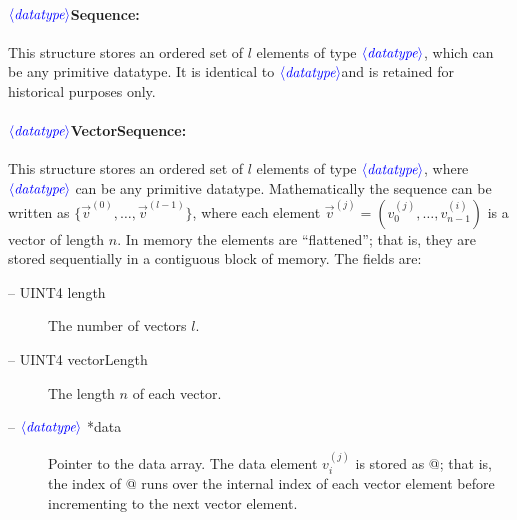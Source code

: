 \documentclass[10pt]{ligodcc}
\renewcommand{\texttt}[1]{{\ttfamily\color{blue}#1}}
\newcommand{\opt}[1]{\ensuremath{\color{blue}\langle\textit{#1}\rangle}}
\begin{document}
\paragraph{\opt{datatype}\texttt{Sequence}:}
This structure stores an ordered set of $l$ elements of type
\opt{datatype}, which can be any primitive datatype.  It is
identical to \opt{datatype}\verb@Vector@ and is retained for historical
purposes only.

\paragraph{\opt{datatype}\texttt{VectorSequence}:}
This structure stores an ordered set of $l$ elements of type
\opt{datatype}\verb@Vector@, where \opt{datatype} can be any primitive
datatype.  Mathematically the sequence can be written as
$\{\vec{v}^{(0)},\ldots,\vec{v}^{(l-1)}\}$, where each element
$\vec{v}^{(j)}=(v^{(j)}_0,\ldots,v^{(i)}_{n-1})$ is a vector of length
$n$.  In memory the elements are ``flattened''; that is, they are
stored sequentially in a contiguous block of memory.  The fields are:
\begin{description}
\item[-- \texttt{UINT4 length}] The number of vectors $l$.
\item[-- \texttt{UINT4 vectorLength}] The length $n$ of each vector.
\item[-- \opt{datatype} \texttt{*data}] Pointer to the data array.  The data
element $v^{(j)}_i$ is stored as @;
that is, the index of \verb@data[]@ runs over the internal index of
each vector element before incrementing to the next vector element.
\end{description}
\end{document}
